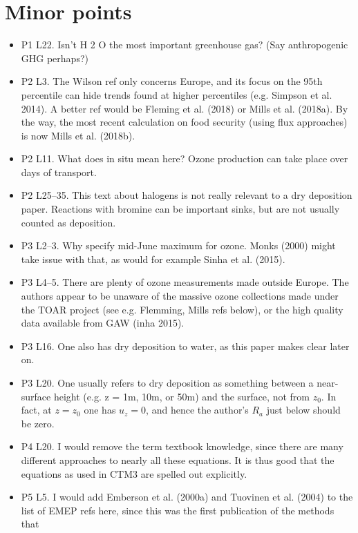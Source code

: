 \documentclass{scrartcl}
\begin{document}
\section{Minor points}
\begin{itemize}
\item {\color{blue}P1 L22. Isn’t H 2 O the most important greenhouse gas? (Say anthropogenic
GHG perhaps?)}
\item {\color{blue}P2 L3. The Wilson ref only concerns Europe, and its focus on the 95th percentile can hide trends
  found at higher percentiles (e.g. Simpson et al. 2014). A
better ref would be Fleming et al. (2018) or Mills et al. (2018a). By the way,
the most recent calculation on food security (using flux approaches) is now Mills
et al. (2018b).}
\item {\color{blue}P2 L11. What does in situ mean here? Ozone production can take place over
days of transport.}
\item {\color{blue}P2 L25--35. This text about halogens is not really relevant to a dry deposition
paper. Reactions with bromine can be important sinks, but are not usually counted
as deposition.}
\item {\color{blue}P3 L2--3. Why specify mid-June maximum for ozone. Monks (2000) might
take issue with that, as would for example Sinha et al. (2015).}
\item {\color{blue}P3 L4--5. There are plenty of ozone measurements made outside Europe. The
authors appear to be unaware of the massive ozone collections made under the
TOAR project (see e.g. Flemming, Mills refs below), or the high quality data
available from GAW (inha 2015).}
\item {\color{blue}P3 L16. One also has dry deposition to water, as this paper makes clear later
on.}
\item {\color{blue}P3 L20. One usually refers to dry deposition as something between a near-
surface height (e.g. z = 1m, 10m, or 50m) and the surface, not from $z_0$. In fact,
at $z = z_0$ one has $u_z = 0$, and hence the author’s $R_a$ just below should be zero.}
\item {\color{blue}P4 L20. I would remove the term textbook knowledge, since there are many
different approaches to nearly all these equations. It is thus good that the equations
as used in CTM3 are spelled out explicitly.}
\item {\color{blue}P5 L5. I would add Emberson et al. (2000a) and Tuovinen et al. (2004) to
the list of EMEP refs here, since this was the first publication of the methods that
}
\end{itemize}
\end{document}
